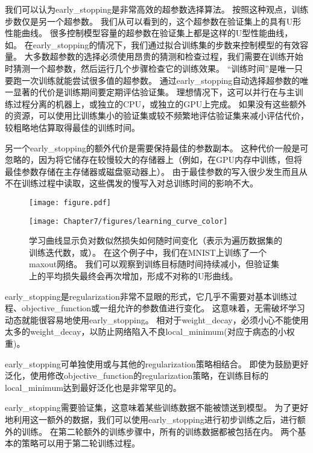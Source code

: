 我们可以认为\gls{early_stopping}是非常高效的超参数选择算法。
按照这种观点，训练步数仅是另一个超参数。
我们从可以看到的，这个超参数在验证集上的具有U形性能曲线。
很多控制模型容量的超参数在验证集上都是这样的U型性能曲线，如。
在\gls{early_stopping}的情况下，我们通过拟合训练集的步数来控制模型的有效容量。
大多数超参数的选择必须使用昂贵的猜测和检查过程，我们需要在训练开始时猜测一个超参数，然后运行几个步骤检查它的训练效果。
``训练时间''是唯一只要跑一次训练就能尝试很多值的超参数。
通过\gls{early_stopping}自动选择超参数的唯一显著的代价是训练期间要定期评估验证集。
理想情况下，这可以并行在与主训练过程分离的机器上，或独立的CPU，或独立的GPU上完成。
如果没有这些额外的资源，可以使用比训练集小的验证集或较不频繁地评估验证集来减小评估代价，较粗略地估算取得最佳的训练时间。

另一个\gls{early_stopping}的额外代价是需要保持最佳的参数副本。
这种代价一般是可忽略的，因为将它储存在较慢较大的存储器上（例如，在GPU内存中训练，但将最佳参数存储在主存储器或磁盘驱动器上）。
由于最佳参数的写入很少发生而且从不在训练过程中读取，这些偶发的慢写入对总训练时间的影响不大。

\begin{figure}[!htb]
\ifOpenSource
\centerline{\texttt{[image: figure.pdf]}}
\else
\centerline{\texttt{[image: Chapter7/figures/learning\_curve\_color]}}
\fi
\caption{学习曲线显示负对数似然损失如何随时间变化（表示为遍历数据集的训练迭代数，或）。
在这个例子中，我们在MNIST上训练了一个\gls{maxout}网络。
我们可以观察到训练目标随时间持续减小，但验证集上的平均损失最终会再次增加，形成不对称的U形曲线。
}
\label{fig:chap7_learning_curve}
\end{figure}


\gls{early_stopping}是\gls{regularization}非常不显眼的形式，它几乎不需要对基本训练过程、\gls{objective_function}或一组允许的参数值进行变化。
这意味着，无需破坏学习动态就能很容易地使用\gls{early_stopping}。
相对于\gls{weight_decay}，必须小心不能使用太多的\gls{weight_decay}，以防止网络陷入不良\gls{local_minimum}(对应于病态的小权重)。

\gls{early_stopping}可单独使用或与其他的\gls{regularization}策略相结合。
即使为鼓励更好泛化，使用修改\gls{objective_function}的\gls{regularization}策略，在训练目标的\gls{local_minimum}达到最好泛化也是非常罕见的。

\gls{early_stopping}需要验证集，这意味着某些训练数据不能被馈送到模型。
为了更好地利用这一额外的数据，我们可以使用\gls{early_stopping}进行初步训练之后，进行额外的训练。
在第二轮额外的训练步骤中，所有的训练数据都被包括在内。
两个基本的策略可以用于第二轮训练过程。

